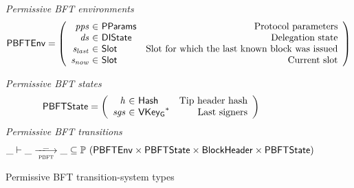 \documentclass[11pt,a4paper]{article}
\newcommand{\powerset}[1]{\mathbb{P}~#1}
\newcommand{\var}[1]{\mathit{#1}}
\newcommand{\type}[1]{\mathsf{#1}}
\newcommand{\trans}[2]{\xlongrightarrow[\textsc{#1}]{#2}}
\newcommand{\seqof}[1]{#1^{*}}
\newcommand{\Hash}{\type{Hash}}  %
\newcommand{\Slot}{\type{Slot}}
\newcommand{\VKeyGen}{\type{VKey_G}}
\newcommand{\DelegState}{\type{DIState}}
\newcommand{\ProtParams}{\type{PParams}} %
\begin{document}
\begin{figure}[ht]
  \emph{Permissive BFT environments}
  \begin{equation*}
    \PBFTEnv =
    \left(
      \begin{array}{r@{~\in~}lr}
        \var{pps} & \ProtParams & \text{Protocol parameters} \\
        \var{ds} & \DelegState & \text{Delegation state} \\
        \var{s_{last}} & \Slot & \text{Slot for which the last known block was issued} \\
        \var{s_{now}} & \Slot & \text{Current slot} \\
      \end{array}
    \right)
  \end{equation*}

  \emph{Permissive BFT states}
  \begin{equation*}
    \PBFTState =
    \left(
      \begin{array}{r@{~\in~}lr}
        \var{h} & \Hash & \text{Tip header hash} \\
        \var{sgs} & \seqof{\VKeyGen} & \text{Last signers}
      \end{array}
    \right)
  \end{equation*}
  \emph{Permissive BFT transitions}
  \begin{equation*}
    \_ \vdash \var{\_} \trans{pbft}{\_} \var{\_} \subseteq
    \powerset (\PBFTEnv \times \PBFTState \times \Bhead \times \PBFTState)
  \end{equation*}
  \caption{Permissive BFT transition-system types}
  \label{fig:ts-types:pbft}
\end{figure}
\end{document}
